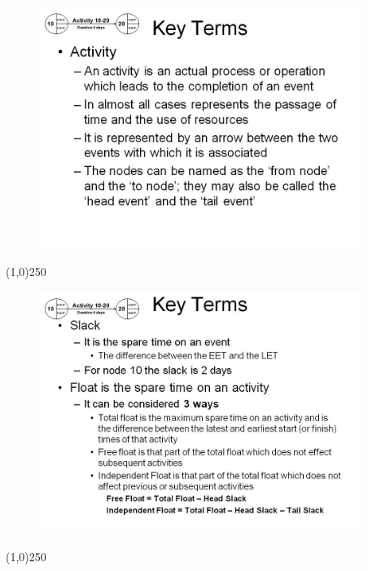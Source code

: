 \begin{frame}
\begin{figure}
	\centering
		\includegraphics[width = 10.5cm]{oldnotes/Slide56.jpg}
\end{figure}
\end{frame}
\begin{center}\line(1,0){250}\end{center}





\begin{frame}
\begin{figure}
	\centering
		\includegraphics[width = 10.5cm]{oldnotes/Slide57.jpg}
\end{figure}
\end{frame}
\begin{center}\line(1,0){250}\end{center}





